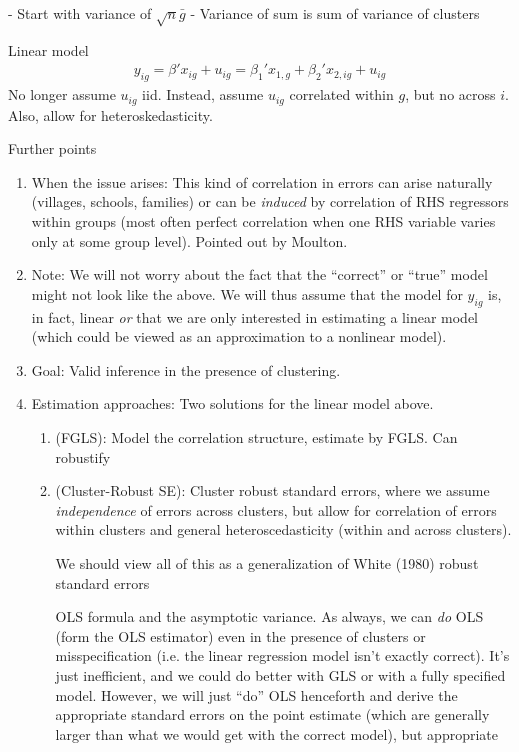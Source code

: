 \documentclass[12pt]{article}
\theoremstyle{plain}
\theoremstyle{definition}
\theoremstyle{remark}
\begin{document}
- Start with variance of $\sqrt{n}\bar{g}$
- Variance of sum is sum of variance of clusters

\clearpage
Linear model
\begin{align*}
  y_{ig}
  =
  \beta'x_{ig} + u_{ig}
  =
  \beta_1'x_{1,g} + \beta_2'x_{2,ig} + u_{ig}
\end{align*}
No longer assume $u_{ig}$ iid.
Instead, assume $u_{ig}$ correlated within $g$, but no across $i$.
Also, allow for heteroskedasticity.

Further points
\begin{enumerate}
  \item When the issue arises:
    This kind of correlation in errors can arise naturally (villages,
    schools, families) or can be \emph{induced} by correlation of RHS
    regressors within groups (most often perfect correlation when one
    RHS variable varies only at some group level).
    Pointed out by Moulton.

  \item
    Note: We will not worry about the fact that the ``correct'' or
    ``true'' model might not look like the above.
    We will thus assume that the model for $y_{ig}$ is, in fact, linear
    \emph{or} that we are only interested in estimating a linear
    model (which could be viewed as an approximation to a nonlinear
    model).

  \item
    Goal: Valid inference in the presence of clustering.

  \item
    Estimation approaches:
    Two solutions for the linear model above.
    \begin{enumerate}
      \item (FGLS):
        Model the correlation structure, estimate by FGLS.
        Can robustify

      \item (Cluster-Robust SE):
        Cluster robust standard errors, where we assume \emph{independence}
        of errors across clusters, but allow for correlation of errors
        within clusters and general heteroscedasticity (within and across
        clusters).

        We should view all of this as a generalization of White (1980)
        robust standard errors

        OLS formula and the asymptotic variance.
        As always, we can \emph{do} OLS (form the OLS estimator) even in the
        presence of clusters or misspecification (i.e. the linear regression
        model isn't exactly correct).
        It's just inefficient, and we could do better with GLS or with a
        fully specified model.
        However, we will just ``do'' OLS henceforth and derive the
        appropriate standard errors on the point estimate (which are
        generally larger than what we would get with the correct model), but
        appropriate


\end{enumerate}
\end{enumerate}
\end{document}
